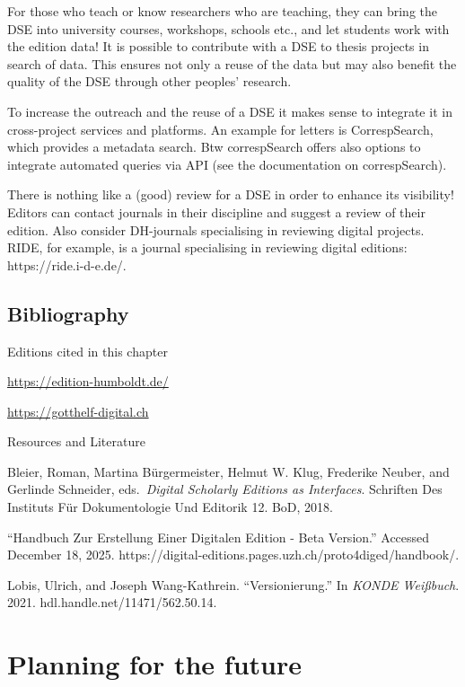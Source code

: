 \documentclass[
  letterpaper,
  DIV=11,
  numbers=noendperiod]{scrreprt}
\begin{document}
For those who teach or know researchers who are teaching, they can bring
the DSE into university courses, workshops, schools etc., and let
students work with the edition data! It is possible to contribute with a
DSE to thesis projects in search of data. This ensures not only a reuse
of the data but may also benefit the quality of the DSE through other
peoples' research.

To increase the outreach and the reuse of a DSE it makes sense to
integrate it in cross-project services and platforms. An example for
letters is CorrespSearch, which provides a metadata search. Btw
correspSearch offers also options to integrate automated queries via API
(see the documentation on correspSearch).

There is nothing like a (good) review for a DSE in order to enhance its
visibility! Editors can contact journals in their discipline and suggest
a review of their edition. Also consider DH-journals specialising in
reviewing digital projects. RIDE, for example, is a journal specialising
in reviewing digital editions: https://ride.i-d-e.de/.

\section{Bibliography}\label{bibliography-4}

Editions cited in this chapter

\url{https://edition-humboldt.de/}

\url{https://gotthelf-digital.ch}

Resources and Literature

Bleier, Roman, Martina Bürgermeister, Helmut W. Klug, Frederike Neuber,
and Gerlinde Schneider, eds.~\emph{Digital Scholarly Editions as
Interfaces}. Schriften Des Instituts Für Dokumentologie Und Editorik 12.
BoD, 2018.

``Handbuch Zur Erstellung Einer Digitalen Edition - Beta Version.''
Accessed December 18, 2025.
https://digital-editions.pages.uzh.ch/proto4diged/handbook/.

Lobis, Ulrich, and Joseph Wang-Kathrein. ``Versionierung.'' In
\emph{KONDE Weißbuch}. 2021. hdl.handle.net/11471/562.50.14.


\chapter{Planning for the future}\label{planning-for-the-future}
\end{document}
